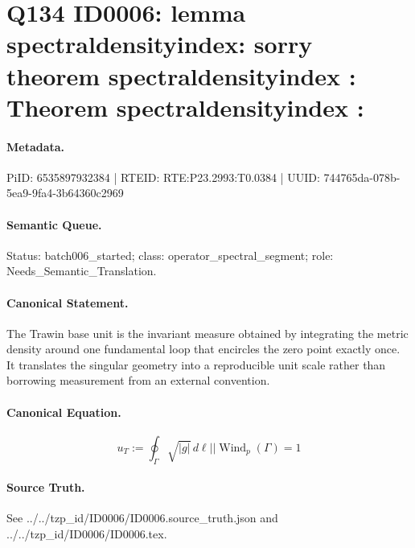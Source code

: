 \section*{Q134 ID0006: lemma spectraldensityindex: sorry theorem spectraldensityindex : Theorem spectraldensityindex :}
\paragraph{Metadata.}
PiID: 6535897932384 | RTEID: RTE:P23.2993:T0.0384 | UUID: 744765da-078b-5ea9-9fa4-3b64360c2969

\paragraph{Semantic Queue.}
Status: batch006\_started; class: operator\_spectral\_segment; role: Needs\_Semantic\_Translation.

\paragraph{Canonical Statement.}
The Trawin base unit is the invariant measure obtained by integrating the metric density around one fundamental loop that encircles the zero point exactly once. It translates the singular geometry into a reproducible unit scale rather than borrowing measurement from an external convention.

\paragraph{Canonical Equation.}
\[
u_{T} := \oint_{\Gamma} \sqrt{\lvert g \rvert}\, d\ell || \operatorname{Wind}_{p}(\Gamma)=1
\]

\paragraph{Source Truth.}
See ../../tzp\_id/ID0006/ID0006.source\_truth.json and ../../tzp\_id/ID0006/ID0006.tex.
